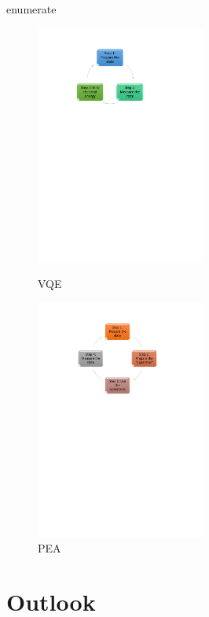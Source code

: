 enumerate\documentclass[14pt,landscape,color=UCLdarkred,margin=3cm]{uclposter}
\begin{document}
\begin{multicols}{3}
\begin{figure}[H]
  \begin{center}
   \begin{minipage}[c]{15em}
    \includegraphics[width=15em]{VQEdiagram.pdf}
    \caption{VQE}
  \end{minipage}
  \qquad
  \begin{minipage}[c]{15em}
    \includegraphics[width=15em]{PEA.pdf}
    \caption{PEA}
  \end{minipage}
  \end{center}

   
\end{figure}



\section*{Outlook}


\end{multicols}
\end{document}
